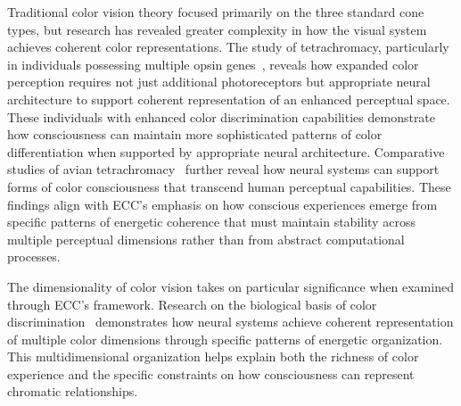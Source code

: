 Traditional color vision theory focused primarily on the three standard cone types, but research has revealed greater complexity in how the visual system achieves coherent color representations. The study of tetrachromacy, particularly in individuals possessing multiple opsin genes~\cite{Jameson2001, da2024mathematical}, reveals how expanded color perception requires not just additional photoreceptors but appropriate neural architecture to support coherent representation of an enhanced perceptual space. These individuals with enhanced color discrimination capabilities demonstrate how consciousness can maintain more sophisticated patterns of color differentiation when supported by appropriate neural architecture. Comparative studies of avian tetrachromacy~\cite{Wilkins2020, zheng2025unbearable} further reveal how neural systems can support forms of color consciousness that transcend human perceptual capabilities. These findings align with ECC's emphasis on how conscious experiences emerge from specific patterns of energetic coherence that must maintain stability across multiple perceptual dimensions rather than from abstract computational processes.

The dimensionality of color vision takes on particular significance when examined through ECC's framework. Research on the biological basis of color discrimination~\cite{Jacobs2018, amil2024theta} demonstrates how neural systems achieve coherent representation of multiple color dimensions through specific patterns of energetic organization. This multidimensional organization helps explain both the richness of color experience and the specific constraints on how consciousness can represent chromatic relationships.

